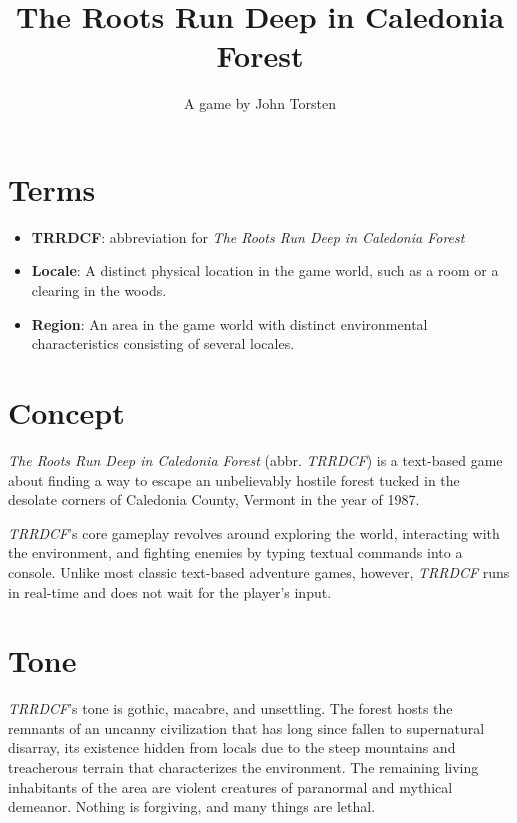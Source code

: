 \documentclass[11pt]{article}
\title{The Roots Run Deep in Caledonia Forest}
\author{A game by John Torsten}
\begin{document}
	\maketitle
	\tableofcontents
	\clearpage

	\section{Terms}
	
	\begin{itemize}
		\item \textbf{TRRDCF}: abbreviation for \textit{The Roots Run Deep in Caledonia Forest}
		\item \textbf{Locale}: A distinct physical location in the game world, such as a room or a clearing in the woods.
		\item \textbf{Region}: An area in the game world with distinct environmental characteristics consisting of several locales.
	\end{itemize}
	
	
	\section{Concept}
	
	\textit{The Roots Run Deep in Caledonia Forest} (abbr. \textit{TRRDCF}) is a text-based game about finding a way to escape an unbelievably hostile forest tucked in the desolate corners of Caledonia County, Vermont in the year of 1987.
	
	\textit{TRRDCF}'s core gameplay revolves around exploring the world, interacting with the environment, and fighting enemies by typing textual commands into a console. Unlike most classic text-based adventure games, however, \textit{TRRDCF} runs in real-time and does not wait for the player's input.
	
	\section{Tone}
	
	\textit{TRRDCF}'s tone is gothic, macabre, and unsettling. The forest hosts the remnants of an uncanny civilization that has long since fallen to supernatural disarray, its existence hidden from locals due to the steep mountains and treacherous terrain that characterizes the environment. The remaining living inhabitants of the area are violent creatures of paranormal and mythical demeanor. Nothing is forgiving, and many things are lethal.
	
\end{document}
